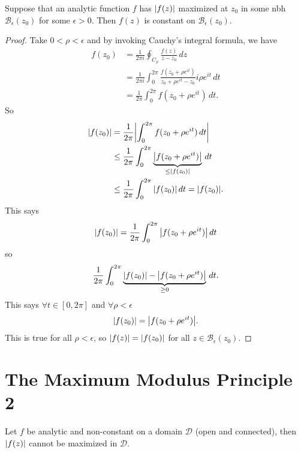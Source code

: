 \documentclass{article}
\theoremstyle{definition}
\newcommand{\f}[2]{\frac{#1}{#2}}
\newcommand{\B}{\mathcal{B}}
\newcommand{\nn}{\nonumber}
\begin{document}
Suppose that an analytic function $f$ has $\abs{f(z)}$ maximized at $z_0$ in some nbh $\B_\epsilon(z_0)$ for some $\epsilon > 0$. Then $f(z)$ is constant on $\B_\epsilon(z_0)$.

\begin{proof}
	Take $0 < \rho < \epsilon$ and by invoking Cauchy's integral formula, we have
	\begin{align}
	f(z_0) &=  \f{1}{2\pi i}\oint_{C_\rho} \f{f(z)}{z-z_0}\,dz\nn\\
	&= \f{1}{2\pi i}\int^{2\pi}_0 \f{f(z_0 + \rho e^{it})}{z_0 + \rho e^{it}-z_0}i\rho e^{it}\,dt\nn\\
	&= \f{1}{2\pi}\int^{2\pi}_0 f(z_0 + \rho e^{it})\,dt.
	\end{align}
	So
	\begin{align}
	\abs{f(z_0)} &= \f{1}{2\pi}\abs{\int^{2\pi}_0  f(z_0 + \rho e^{it})\,dt  }\nn\\
	&\leq \f{1}{2\pi}\int^{2\pi}_0 \underbrace{\abs{f(z_0 + \rho e^{it})}}_{\leq \abs{f(z_0)}}\,dt\nn\\
	&\leq \f{1}{2\pi }\int^{2\pi}_0 \abs{f(z_0)}\,dt = \abs{f(z_0)}.
	\end{align}
	This says 
	\begin{align}
	\abs{f(z_0)} = \f{1}{2\pi}\int^{2\pi}_0 \abs{f(z_0 + \rho e^{it})}\,dt
	\end{align}
	so
	\begin{align}
	\f{1}{2\pi}\int^{2\pi}_0 \underbrace{ \abs{f(z_0)} -\abs{f(z_0 + \rho e^{it})}}_{\geq 0}\,dt.
	\end{align}
	This says $\forall t \in [0,2\pi]$ and $\forall \rho < \epsilon$ 
	\begin{align}
	\abs{f(z_0)} = \abs{f(z_0 + \rho e^{it})}.
	\end{align}
	This is true for all $\rho < \epsilon$, so $\abs{f(z)} = \abs{f(z_0)}$ for all $z \in \B_\epsilon(z_0)$.
\end{proof}



\section{The Maximum Modulus Principle 2}
Let $f$ be analytic and non-constant on a domain $\mathcal{D}$ (open and connected), then $\abs{f(z)}$ cannot be maximized in $\mathcal{D}$. 
\end{document}
